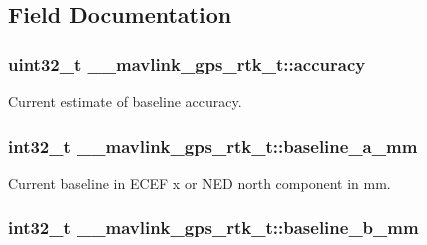 \subsection{Field Documentation}
\hypertarget{struct____mavlink__gps__rtk__t_a0d8bd42ee6ca806000b1eae16eb3c48c}{
\subsubsection[{accuracy}]{\setlength{\rightskip}{0pt plus 5cm}uint32\+\_\+t \+\_\+\+\_\+mavlink\+\_\+gps\+\_\+rtk\+\_\+t\+::accuracy}}\label{struct____mavlink__gps__rtk__t_a0d8bd42ee6ca806000b1eae16eb3c48c}


Current estimate of baseline accuracy. 

\hypertarget{struct____mavlink__gps__rtk__t_ae00834f14f3a2e1bf64c1e9b63493214}{
\subsubsection[{baseline\+\_\+a\+\_\+mm}]{\setlength{\rightskip}{0pt plus 5cm}int32\+\_\+t \+\_\+\+\_\+mavlink\+\_\+gps\+\_\+rtk\+\_\+t\+::baseline\+\_\+a\+\_\+mm}}\label{struct____mavlink__gps__rtk__t_ae00834f14f3a2e1bf64c1e9b63493214}


Current baseline in E\+C\+E\+F x or N\+E\+D north component in mm. 

\hypertarget{struct____mavlink__gps__rtk__t_a3f7489516e86ebcb1702edac1ca8170c}{
\subsubsection[{baseline\+\_\+b\+\_\+mm}]{\setlength{\rightskip}{0pt plus 5cm}int32\+\_\+t \+\_\+\+\_\+mavlink\+\_\+gps\+\_\+rtk\+\_\+t\+::baseline\+\_\+b\+\_\+mm}}\label{struct____mavlink__gps__rtk__t_a3f7489516e86ebcb1702edac1ca8170c}


